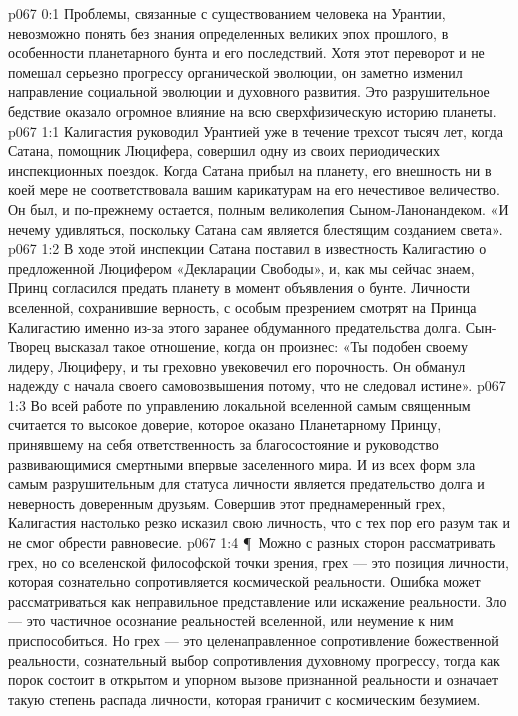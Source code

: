 \author{Мелхиседек}
\vs p067 0:1 Проблемы, связанные с существованием человека на Урантии, невозможно понять без знания определенных великих эпох прошлого, в особенности планетарного бунта и его последствий. Хотя этот переворот и не помешал серьезно прогрессу органической эволюции, он заметно изменил направление социальной эволюции и духовного развития. Это разрушительное бедствие оказало огромное влияние на всю сверхфизическую историю планеты.
\vs p067 1:1 Калигастия руководил Урантией уже в течение трехсот тысяч лет, когда Сатана, помощник Люцифера, совершил одну из своих периодических инспекционных поездок. Когда Сатана прибыл на планету, его внешность ни в коей мере не соответствовала вашим карикатурам на его нечестивое величество. Он был, и по\hyp{}прежнему остается, полным великолепия Сыном\hyp{}Ланонандеком. «И нечему удивляться, поскольку Сатана сам является блестящим созданием света».
\vs p067 1:2 В ходе этой инспекции Сатана поставил в известность Калигастию о предложенной Люцифером «Декларации Свободы», и, как мы сейчас знаем, Принц согласился предать планету в момент объявления о бунте. Личности вселенной, сохранившие верность, с особым презрением смотрят на Принца Калигастию именно из\hyp{}за этого заранее обдуманного предательства долга. Сын\hyp{}Творец высказал такое отношение, когда он произнес: «Ты подобен своему лидеру, Люциферу, и ты греховно увековечил его порочность. Он обманул надежду с начала своего самовозвышения потому, что не следовал истине».
\vs p067 1:3 Во всей работе по управлению локальной вселенной самым священным считается то высокое доверие, которое оказано Планетарному Принцу, принявшему на себя ответственность за благосостояние и руководство развивающимися смертными впервые заселенного мира. И из всех форм зла самым разрушительным для статуса личности является предательство долга и неверность доверенным друзьям. Совершив этот преднамеренный грех, Калигастия настолько резко исказил свою личность, что с тех пор его разум так и не смог обрести равновесие.
\vs p067 1:4 \P\ Можно с разных сторон рассматривать грех, но со вселенской философской точки зрения, грех --- это позиция личности, которая сознательно сопротивляется космической реальности. Ошибка может рассматриваться как неправильное представление или искажение реальности. Зло --- это частичное осознание реальностей вселенной, или неумение к ним приспособиться. Но грех --- это целенаправленное сопротивление божественной реальности, сознательный выбор сопротивления духовному прогрессу, тогда как порок состоит в открытом и упорном вызове признанной реальности и означает такую степень распада личности, которая граничит с космическим безумием.
